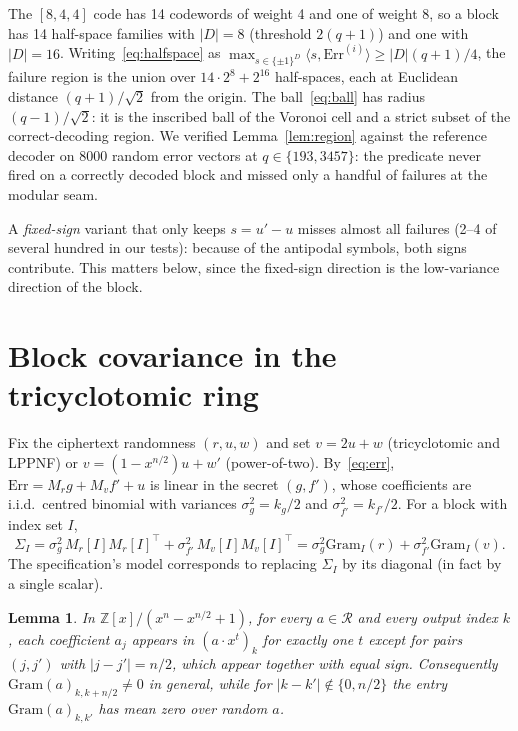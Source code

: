 \documentclass[11pt,a4paper]{article}
\newtheorem{lemma}{Lemma}
\theoremstyle{definition}
\theoremstyle{remark}
\newcommand{\Err}{\mathrm{Err}}
\newcommand{\Gram}{\mathrm{Gram}}
\newcommand{\Z}{\mathbb{Z}}
\newcommand{\R}{\mathcal{R}}
\begin{document}
The $[8,4,4]$ code has 14 codewords of weight 4 and one of weight 8, so a
block has 14 half-space families with $|D|=8$ (threshold $2(q+1)$) and one
with $|D|=16$. Writing~\eqref{eq:halfspace} as
$\max_{s\in\{\pm1\}^D}\langle s,\Err^{(i)}\rangle\ge|D|(q+1)/4$, the failure
region is the union over $14\cdot 2^8+2^{16}$ half-spaces, each at
Euclidean distance $(q+1)/\sqrt2$ from the origin. The ball~\eqref{eq:ball}
has radius $(q-1)/\sqrt2$: it is the inscribed ball of the Voronoi cell and
a strict subset of the correct-decoding region. We verified
Lemma~\ref{lem:region} against the reference decoder on $8000$ random error
vectors at $q\in\{193,3457\}$: the predicate never fired on a correctly
decoded block and missed only a handful of failures at the modular seam.

A \emph{fixed-sign} variant that only keeps $s=u'-u$ misses almost all
failures (2--4 of several hundred in our tests): because of the antipodal
symbols, both signs contribute. This matters below, since the fixed-sign
direction is the low-variance direction of the block.

\section{Block covariance in the tricyclotomic ring}
\label{sec:cov}

Fix the ciphertext randomness $(r,u,w)$ and set $v=2u+w$ (tricyclotomic and
LPPNF) or $v=(1-x^{n/2})u+w'$ (power-of-two). By~\eqref{eq:err},
$\Err=M_r g+M_v f'+u$ is linear in the secret $(g,f')$, whose coefficients
are i.i.d.\ centred binomial with variances $\sigma_g^2=k_g/2$ and
$\sigma_{f'}^2=k_{f'}/2$. For a block with index set $I$,
\begin{equation}
\label{eq:sigma}
\Sigma_I=\sigma_g^2\,M_r[I]M_r[I]^\top+\sigma_{f'}^2\,M_v[I]M_v[I]^\top
=\sigma_g^2\Gram_I(r)+\sigma_{f'}^2\Gram_I(v).
\end{equation}
The specification's model corresponds to replacing $\Sigma_I$ by its
diagonal (in fact by a single scalar).

\begin{lemma}
\label{lem:pair}
In $\Z[x]/(x^n-x^{n/2}+1)$, for every $a\in\R$ and every output index $k$,
each coefficient $a_j$ appears in $(a\cdot x^t)_k$ for exactly one $t$
except for pairs $(j,j')$ with $|j-j'|=n/2$, which appear together with
equal sign. Consequently $\Gram(a)_{k,k+n/2}\ne 0$ in general, while for
$|k-k'|\notin\{0,n/2\}$ the entry $\Gram(a)_{k,k'}$ has mean zero over
random $a$.
\end{lemma}
\end{document}
